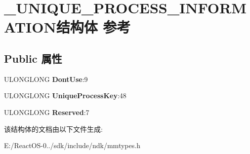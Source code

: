 \hypertarget{struct___u_n_i_q_u_e___p_r_o_c_e_s_s___i_n_f_o_r_m_a_t_i_o_n}{}\section{\+\_\+\+U\+N\+I\+Q\+U\+E\+\_\+\+P\+R\+O\+C\+E\+S\+S\+\_\+\+I\+N\+F\+O\+R\+M\+A\+T\+I\+O\+N结构体 参考}
\label{struct___u_n_i_q_u_e___p_r_o_c_e_s_s___i_n_f_o_r_m_a_t_i_o_n}
\subsection*{Public 属性}
\begin{DoxyCompactItemize}
\item 
\mbox{\label{struct___u_n_i_q_u_e___p_r_o_c_e_s_s___i_n_f_o_r_m_a_t_i_o_n_ad2f0532e1f4085ed631c888478f5afdf}} 
U\+L\+O\+N\+G\+L\+O\+NG {\bfseries Dont\+Use}\+:9
\item 
\mbox{\label{struct___u_n_i_q_u_e___p_r_o_c_e_s_s___i_n_f_o_r_m_a_t_i_o_n_a79dd6940e88fe25a108e67dcc39d9c44}} 
U\+L\+O\+N\+G\+L\+O\+NG {\bfseries Unique\+Process\+Key}\+:48
\item 
\mbox{\label{struct___u_n_i_q_u_e___p_r_o_c_e_s_s___i_n_f_o_r_m_a_t_i_o_n_a555c8fea0bdfc52cc53b530ce0c86794}} 
U\+L\+O\+N\+G\+L\+O\+NG {\bfseries Reserved}\+:7
\end{DoxyCompactItemize}


该结构体的文档由以下文件生成\+:\begin{DoxyCompactItemize}
\item 
E\+:/\+React\+O\+S-\/0../sdk/include/ndk/mmtypes.\+h\end{DoxyCompactItemize}
